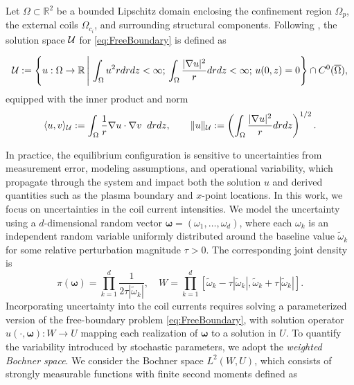 Let $\Omega \subset \mathbb{R}^2$ be a bounded Lipschitz domain enclosing the confinement region $\Omega_p$, the external coils $\Omega_{c_i}$, and surrounding structural components.  
Following \cite{Gr:1999}, the solution space $\mathcal{U}$ for \eqref{eq:FreeBoundary} is defined as

\begin{equation}\label{eq:Soln_space}
    \mathcal{U}:=\left\{u:\Omega\rightarrow \mathbb{R} \,\Bigg| \,\int_\Omega u^2rdrdz<\infty; \,  \int_\Omega\frac{|\nabla u|^2}{r}drdz<\infty; \, u(0,z)=0 \right\}\cap C^0(\overline{\Omega}),
\end{equation}
%
equipped with the inner product and norm
%
\begin{equation}\label{eq:inner_prod_norm}
        \langle u,v\rangle_{\mathcal{U}} := \int_{\Omega} \frac{1}{r} \nabla u\cdot\nabla v \;\;drdz,\qquad \| u \|_{\mathcal{U}} :=\left(\int_\Omega\frac{|\nabla u|^2}{r} drdz\right)^{1/2}.
\end{equation}
%

In practice, the equilibrium configuration is sensitive to uncertainties from measurement error, modeling assumptions, and operational variability, which propagate through the system and impact both the solution $u$ and derived quantities such as the plasma boundary and $x$-point locations. In this work, we focus on uncertainties in the coil current intensities. We model the uncertainty using a $d$-dimensional random vector $\boldsymbol{\omega} = (\omega_1, \ldots, \omega_d)$, where each $\omega_k$ is an independent random variable uniformly distributed around the baseline value $\widetilde{\omega}_k$ for some relative perturbation magnitude $\tau > 0$. The corresponding joint density is
%
\[
\pi \left(\boldsymbol{\omega}\right)=\prod_{k=1}^{d} \frac{1}{2\tau |\widetilde{\omega}_k|},\quad W=\prod_{k=1}^{d}\left[\widetilde{\omega}_k-\tau \left\vert \widetilde{\omega}_k\right\vert,\widetilde{\omega}_k+\tau \left\vert \widetilde{\omega}_k \right\vert\right].
\]
%
Incorporating uncertainty into the coil currents requires solving a parameterized version of the free-boundary problem \eqref{eq:FreeBoundary}, with solution operator $u(\cdot,\boldsymbol{\omega}) : W \to U$ mapping each realization of $\boldsymbol{\omega}$ to a solution in $U$. To quantify the variability introduced by stochastic parameters, we adopt the {\it weighted Bochner space}. We consider the Bochner space $L^2(W,U)$, which consists of strongly measurable functions with finite second moments defined as

